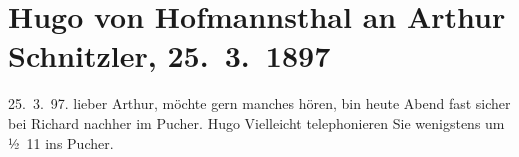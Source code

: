 

         
         \renewcommand{\erwaehntePersonen}{Personen: Richard Beer-Hofmann}
         \renewcommand{\erwaehnteOrte}{Orte: Café Pucher, Wien}
         \renewcommand{\erwaehnteWerke}{}
               \section[Hugo von Hofmannsthal an Arthur Schnitzler, 25. 3. 1897]{ Hugo von Hofmannsthal an Arthur Schnitzler,
                    25. 3. 1897}\nopagebreak{}\rehead{ }\begin{ledgroupsized}[t]{13cm}\normalsize\beginnumbering \toendnotes[C]{\smallbreak\pagebreak[2]} \pstart
           \raggedleft{}{\pb}25. 3. 97.\pend
           \pstart{}lieber Arthur,\pend\pstart
           möchte gern manches hören, bin heute Abend fast sicher bei Richard nachher im Pucher.\pend
           \pstart \spacefill\mbox{Hugo}\pend{}\pstart
           \noindent{}Vielleicht telephonieren Sie wenigstens um ½ 11 ins Pucher.\pend
           
         
         \endnumbering{}\end{ledgroupsized}  \newcommand{\dateiname}{L00663}\newcommand{\titel}{Hugo von Hofmannsthal an Arthur Schnitzler, 25. 3. 1897}\newcommand{\editorInnen}{Martin Anton Müller und Gerd-Hermann Susen}
      